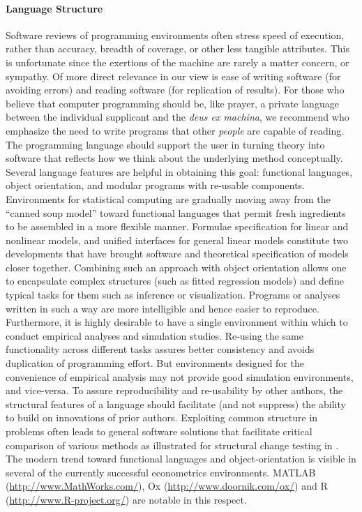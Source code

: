 \documentclass[10pt,a4paper,twoside]{article}
\let\proglang=\textsf
\begin{document}
\paragraph{Language Structure}
Software reviews of programming environments often stress speed
of execution, rather than accuracy, breadth of coverage, or other less tangible
attributes. This is unfortunate since the exertions of the machine are rarely a
matter concern, or sympathy. Of more direct relevance in our view is ease of
writing software (for avoiding errors) and reading software
(for replication of results).  For those who believe that computer
programming should be, like prayer, a private language between the individual
supplicant and the \emph{deus ex machina}, we recommend 
\cite{repro:Kernighan+Plauger:1974} who emphasize the need to write programs 
that other \emph{people} are capable of reading.  The programming language
should support the user in turning theory into software that reflects how
we think about the underlying method conceptually. Several language features are 
helpful in obtaining this goal: functional languages, object orientation, and
modular programs with re-usable components.
Environments for statistical
computing are gradually moving away from the ``canned soup model'' toward 
functional languages  that permit fresh ingredients to be assembled in a more flexible
manner. Formulae specification for linear and nonlinear models, and unified  
interfaces for general linear models constitute two developments that have
brought software and theoretical specification of models closer together.  
Combining such an approach with object orientation allows one to encapsulate
complex structures (such as fitted regression models) and define typical
tasks for them such as inference or visualization. Programs or analyses
written in such a way are more intelligible and hence easier to reproduce.
Furthermore, it is highly desirable to have a single environment within which
to conduct empirical analyses and simulation studies. Re-using the same functionality 
across different tasks assures better consistency and avoids duplication of programming effort.
But environments designed for the convenience of empirical analysis may not provide
good simulation environments, and vice-versa.  To assure reproducibility
and re-usability by other authors, the structural features of a language should
facilitate (and not suppress) the ability to build on innovations of prior authors.  
Exploiting common structure in problems
often leads to general software solutions that facilitate critical comparison
of various methods as illustrated for structural change testing
in \cite{repro:Zeileis:2006a}. 
The modern trend toward functional
languages and object-orientation is visible in several of the currently 
successful econometrics environments.
\proglang{MATLAB} (\url{http://www.MathWorks.com/}),
\proglang{Ox} (\url{http://www.doornik.com/ox/}) and
\proglang{R} (\url{http://www.R-project.org/})
are notable in this respect.  
\end{document}
